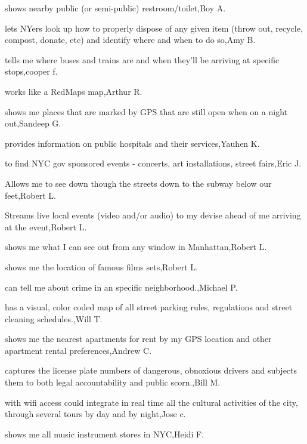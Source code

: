 \documentclass{article}
\begin{document}
shows nearby public (or semi-public) restroom/toilet,Boy A.

lets NYers look up how to properly dispose of any given item (throw out, recycle, compost, donate, etc) and identify where and when to do so,Amy B.

tells me where buses and trains are and when they'll be arriving at specific stops,cooper f.

works like a RedMaps map,Arthur R.

shows me places that are marked by GPS that are still open when on a night out,Sandeep G.

provides information on public hospitals and their services,Yauhen K.

to find NYC gov sponsored events - concerts, art installations, street fairs,Eric J.

Allows me to see down though the streets down to the subway below our feet,Robert L.

Streams live local events (video and/or audio) to my devise ahead of me arriving at the event,Robert L.

shows me what I can see out from any window in Manhattan,Robert L.

shows me the location of famous films sets,Robert L.

can tell me about crime in an specific neighborhood.,Michael P.

has a visual, color coded map of all street parking rules, regulations and street cleaning schedules.,Will T.

shows me the nearest apartments for rent by my GPS location and other apartment rental preferences,Andrew C.

captures the license plate numbers of dangerous, obnoxious drivers and subjects them to both legal accountability and public scorn.,Bill M.

with wifi access could integrate in real time all the cultural activities of the city, through several tours by day and by night,Jose c.

shows me all music instrument stores in NYC,Heidi F.

\printindex
\end{document}
